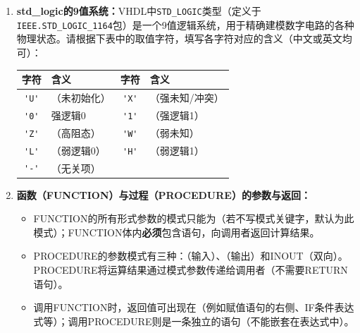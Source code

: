 \begin{enumerate}[label=\arabic*.]

\item \textbf{std\_logic的9值系统：}VHDL中\texttt{STD\_LOGIC}类型（定义于\texttt{IEEE.STD\_LOGIC\_1164}包）是一个9值逻辑系统，用于精确建模数字电路的各种物理状态。请根据下表中的取值字符，填写各字符对应的含义（中文或英文均可）：

\vspace{0.2cm}

\begin{center}
\begin{tabular}{|c|l|c|l|}
\hline
\textbf{字符} & \textbf{含义} & \textbf{字符} & \textbf{含义} \\
\hline
\verb|'U'| & \underline{\hspace{2.5cm}}（未初始化） & \verb|'X'| & \underline{\hspace{2.5cm}}（强未知/冲突） \\
\hline
\verb|'0'| & 强逻辑0 & \verb|'1'| & \underline{\hspace{2.5cm}}（强逻辑1） \\
\hline
\verb|'Z'| & \underline{\hspace{2.5cm}}（高阻态） & \verb|'W'| & \underline{\hspace{2.5cm}}（弱未知） \\
\hline
\verb|'L'| & \underline{\hspace{2.5cm}}（弱逻辑0） & \verb|'H'| & \underline{\hspace{2.5cm}}（弱逻辑1） \\
\hline
\verb|'-'| & \underline{\hspace{2.5cm}}（无关项） & \multicolumn{2}{c|}{} \\
\hline
\end{tabular}
\end{center}

\vspace{0.6cm}

\item \textbf{函数（FUNCTION）与过程（PROCEDURE）的参数与返回：}
\begin{itemize}
  \item FUNCTION的所有形式参数的模式只能为\underline{\hspace{2cm}}（若不写模式关键字，默认为此模式）；FUNCTION体内\textbf{必须}包含\underline{\hspace{2cm}}语句，向调用者返回计算结果。
  \item PROCEDURE的参数模式有三种：\underline{\hspace{1cm}}（输入）、\underline{\hspace{1cm}}（输出）和INOUT（双向）。PROCEDURE将运算结果通过\underline{\hspace{1.5cm}}模式参数传递给调用者（不需要RETURN语句）。
  \item 调用FUNCTION时，返回值可出现在\underline{\hspace{2cm}}（例如赋值语句的右侧、IF条件表达式等）；调用PROCEDURE则是一条独立的\underline{\hspace{2cm}}语句（不能嵌套在表达式中）。
\end{itemize}


\end{enumerate}
